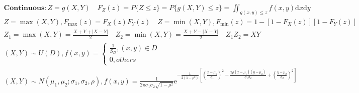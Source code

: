 \documentclass{article}
\begin{document}
\begin{align*}
    \bm{Continuous} : Z = g(X,Y) \quad F_{Z}(z)=P\{Z\le z\} = P\{g(X,Y)\le z\} = \iint_{g(x,y)\le z}f(x,y)\mathrm{d}x\mathrm{d}y \\
    Z=\max(X,Y),F_{\max}(z)=F_{X}(z)F_{Y}(z) \quad Z=\min(X,Y),F_{\min}(z)=1-[1-F_{X}(z)][1-F_{Y}(z)] \\ 
    Z_{1}=\max(X,Y) = \frac{X+Y+|X-Y|}{2} \quad Z_{2}=\min(X,Y)=\frac{X+Y-|X-Y|}{2} \quad Z_{1}Z_{2}=XY \\ 
    (X,Y) \sim U(D), 
    f(x,y) = \left\{ 
    \begin{array}{rl} 
        \frac{1}{S_{D}}, (x,y) \in D\\ 
        0, others
    \end{array} \right. \ \\ 
    (X,Y) \sim N(\mu_{1},\mu_{2};\sigma_{1},\sigma_{2},\rho),f(x,y) = \frac{1}{2\pi \sigma_{1} \sigma_{2} \sqrt{1-\rho^2}} \mathrm{e}^{-\frac{1}{2(1-\rho^2)}[(\frac{x-\mu_{1}}{\sigma_{1}})^2-\frac{2\rho (x-\mu_{1})(y-\mu_{2})}{\sigma_{1}\sigma_{2}}+(\frac{y-\mu_{2}}{\sigma_{2}})^2]} \\
\end{align*}
\clearpage
\end{document}
